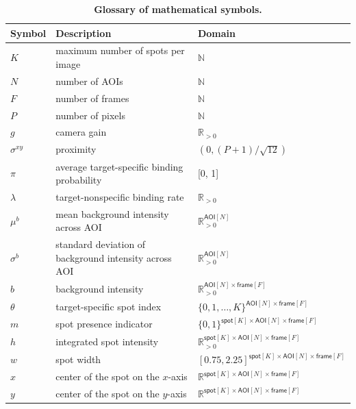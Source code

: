 \begin{table}[h]
\caption{\label{tab:parameters} \textbf{Glossary of mathematical symbols.}}
\begin{tabular}{l l l}
\toprule
Symbol & Description & Domain \\
\midrule
$K$ & maximum number of spots per image & $\mathbb{N}$ \\
$N$ & number of AOIs & $\mathbb{N}$ \rule{0pt}{3ex} \\
$F$ & number of frames & $\mathbb{N}$ \rule{0pt}{3ex} \\
$P$ & number of pixels & $\mathbb{N}$ \rule{0pt}{3ex} \\
$g$ & camera gain & $\mathbb{R}_{>0}$ \rule{0pt}{3ex} \\
$\sigma^{xy}$ & proximity & $(0, (P+1)/\sqrt{12})$ \rule{0pt}{3ex} \\
$\pi$ & average target-specific binding probability & [0, 1] \rule{0pt}{3ex} \\
$\lambda$ & target-nonspecific binding rate & $\mathbb{R}_{>0}$ \rule{0pt}{3ex} \\
$\mu^b$ & mean background intensity across AOI & $\mathbb{R}_{>0}^{\mathsf{AOI}[N]}$ \rule{0pt}{3ex} \\
$\sigma^b$ & standard deviation of background intensity across AOI & $\mathbb{R}_{>0}^{\mathsf{AOI}[N]}$ \rule{0pt}{3ex} \\
$b$ & background intensity & $\mathbb{R}_{>0}^{\mathsf{AOI}[N] \times \mathsf{frame}[F]}$ \rule{0pt}{3ex} \\
$\theta$ & target-specific spot index & $\{0, 1, \dots, K \}^{\mathsf{AOI}[N] \times \mathsf{frame}[F]}$ \rule{0pt}{3ex} \\
$m$ & spot presence indicator & $\{ 0, 1 \}^{\mathsf{spot}[K] \times \mathsf{AOI}[N] \times \mathsf{frame}[F]}$ \rule{0pt}{3ex} \\
$h$ & integrated spot intensity & $\mathbb{R}_{>0}^{\mathsf{spot}[K] \times \mathsf{AOI}[N] \times \mathsf{frame}[F]}$ \rule{0pt}{3ex} \\
$w$ & spot width & $[0.75, 2.25]^{\mathsf{spot}[K] \times \mathsf{AOI}[N] \times \mathsf{frame}[F]}$ \rule{0pt}{3ex} \\
$x$ & center of the spot on the $x$-axis & $\mathbb{R}^{\mathsf{spot}[K] \times \mathsf{AOI}[N] \times \mathsf{frame}[F]}$ \rule{0pt}{3ex} \\
$y$ & center of the spot on the $y$-axis & $\mathbb{R}^{\mathsf{spot}[K] \times \mathsf{AOI}[N] \times \mathsf{frame}[F]}$ \rule{0pt}{3ex} \\

\end{tabular}
\end{table}
